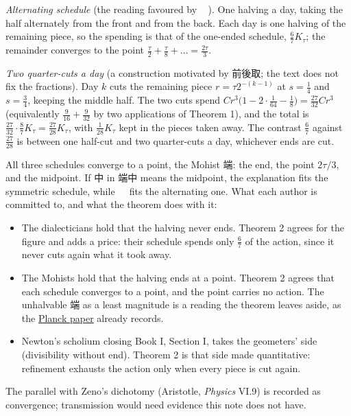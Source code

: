 \documentclass[11pt,a4paper]{article}
\newcommand{\tightlist}{\setlength{\itemsep}{0pt}\setlength{\parskip}{0pt}}
\begin{document}
\emph{Alternating schedule} (the reading favoured by 𣃈必半). One
halving a day, taking the half alternately from the front and from the
back. Each day is one halving of the remaining piece, so the spending is
that of the one-ended schedule, \(\frac67K_\tau\); the remainder
converges to the point \(\frac\tau2+\frac\tau8+\dots=\frac{2\tau}3\).

\emph{Two quarter-cuts a day} (a construction motivated by 前後取; the
text does not fix the fractions). Day \(k\) cuts the remaining piece
\(r=\tau2^{-(k-1)}\) at \(s=\frac14\) and \(s=\frac34\), keeping the
middle half. The two cuts spend
\(C r^3\bigl(1-2\cdot\frac1{64}-\frac18\bigr)=\frac{27}{32}Cr^3\)
(equivalently \(\frac9{16}+\frac9{32}\) by two applications of Theorem
1), and the total is
\(\frac{27}{32}\cdot\frac87K_\tau=\frac{27}{28}K_\tau\), with
\(\frac1{28}K_\tau\) kept in the pieces taken away. The contrast
\(\frac67\) against \(\frac{27}{28}\) is between one half-cut and two
quarter-cuts a day, whichever ends are cut.

All three schedules converge to a point, the Mohist 端: the end, the
point \(2\tau/3\), and the midpoint. If 中 in 端中 means the midpoint,
the explanation fits the symmetric schedule, while 𣃈必半 fits the
alternating one. What each author is committed to, and what the theorem
does with it:

\begin{itemize}
\tightlist
\item
  The dialecticians hold that the halving never ends. Theorem 2 agrees
  for the figure and adds a price: their schedule spends only
  \(\frac67\) of the action, since it never cuts again what it took
  away.
\item
  The Mohists hold that the halving ends at a point. Theorem 2 agrees
  that each schedule converges to a point, and the point carries no
  action. The unhalvable 端 as a least magnitude is a reading the
  theorem leaves aside, as the \href{planck-gap-paper.md}{Planck paper}
  already records.
\item
  Newton's scholium closing Book I, Section I, takes the geometers' side
  (divisibility without end). Theorem 2 is that side made quantitative:
  refinement exhausts the action only when every piece is cut again.
\end{itemize}

The parallel with Zeno's dichotomy (Aristotle, \emph{Physics} VI.9) is
recorded as convergence; transmission would need evidence this note does
not have.
\end{document}
